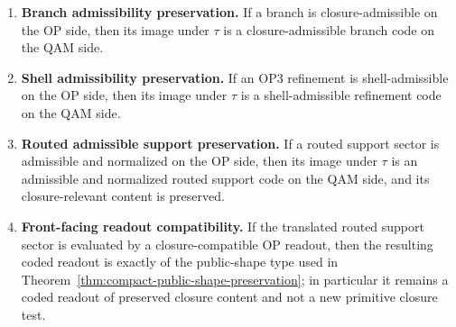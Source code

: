 \begin{theorem}
\begin{enumerate}
\item \textbf{Branch admissibility preservation.}  
If a branch is closure-admissible on the OP side, then its image under $\tau$ is a closure-admissible branch code on the QAM side.

\item \textbf{Shell admissibility preservation.}  
If an OP3 refinement is shell-admissible on the OP side, then its image under $\tau$ is a shell-admissible refinement code on the QAM side.

\item \textbf{Routed admissible support preservation.}  
If a routed support sector is admissible and normalized on the OP side, then its image under $\tau$ is an admissible and normalized routed support code on the QAM side, and its closure-relevant content is preserved.

\item \textbf{Front-facing readout compatibility.}  
If the translated routed support sector is evaluated by a closure-compatible OP readout, then the resulting coded readout is exactly of the public-shape type used in Theorem~\ref{thm:compact-public-shape-preservation}; in particular it remains a coded readout of preserved closure content and not a new primitive closure test.
\end{enumerate}
\end{theorem}

